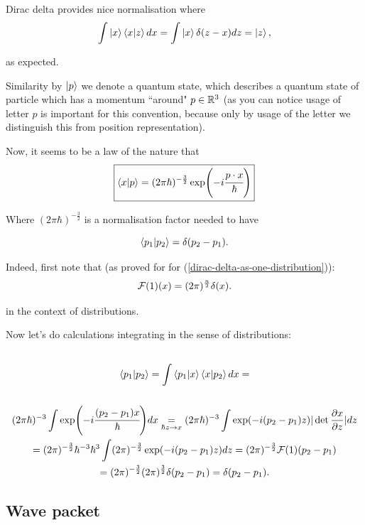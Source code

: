 \documentclass[main.tex]{subfiles}
\begin{document}
Dirac delta provides nice normalisation where
\begin{equation}
\int \ket{x}\bra{x}\ket{z}dx = \int \ket{x}\delta(z - x) dz = \ket{z},  
\end{equation}    

as expected.

Similarity by $\ket{p}$ we denote a quantum state, which describes a quantum state of particle which has a momentum ``around" $p\in \mathbb{R}^3$ (as you can notice usage of letter $p$ is important for this convention, because only by usage of the letter we distinguish this from position representation).

Now, it seems to be a law of the nature that
\begin{equation}
\boxed{
\bra{x}\ket{p} = (2\pi\hbar)^{-\frac{3}{2}} \exp(-i\cfrac{p\cdot x}{\hbar})
}
\end{equation}

Where $(2\pi\hbar)^{-\frac{3}{2}}$ is a normalisation factor needed to have 

\begin{equation}
\bra{p_1}\ket{p_2} = \delta(p_2 - p_1).
\end{equation} 

Indeed, first note that (as proved for for (\ref{dirac-delta-as-one-distribution})):
\begin{equation}
\mathcal{F}(1)(x) = (2\pi)^\frac{n}{2}\delta(x). 
\end{equation}

in the context of distributions.

Now let's do calculations integrating in the sense of distributions:
\begin{multline*}\\
\bra{p_1}\ket{p_2} = \int\bra{p_1} \ket{x}\bra{x} \ket{p_2} dx = \\
\\ (2\pi\hbar)^{-3} \int \exp(-i \cfrac{(p_2 - p_1)x}{\hbar})dx \underset{\hbar z\to x}{=}
(2\pi\hbar)^{-3} \int \exp(-i(p_2 - p_1)z) |\det \frac{\partial x}{\partial z}|dz
\\ = (2\pi)^{-\frac{3}{2}} \hbar^{-3} \hbar^3 \int (2\pi)^{-\frac{3}{2}} \exp(-i(p_2 - p_1)z)dz = (2\pi)^{-\frac{3}{2}} \mathcal{F}(1)(p_2 - p_1)
\\ = (2\pi)^{-\frac{3}{2}} (2\pi)^{\frac{3}{2}} \delta(p_2 - p_1) = \delta(p_2 - p_1).
\\
\end{multline*}



\subsection{Wave packet}
\end{document}
